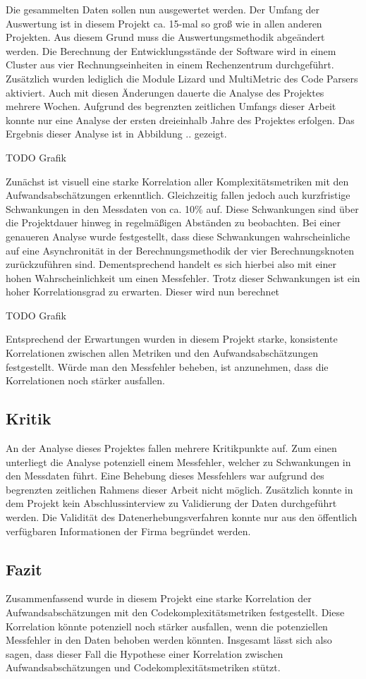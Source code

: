 Die gesammelten Daten sollen nun ausgewertet werden. Der Umfang der
Auswertung ist in diesem Projekt ca. 15-mal so groß wie in allen anderen
Projekten. Aus diesem Grund muss die Auswertungsmethodik abgeändert
werden. Die Berechnung der Entwicklungsstände der Software wird in einem
Cluster aus vier Rechnungseinheiten in einem Rechenzentrum durchgeführt.
Zusätzlich wurden lediglich die Module Lizard und MultiMetric des Code
Parsers aktiviert. Auch mit diesen Änderungen dauerte die Analyse des
Projektes mehrere Wochen. Aufgrund des begrenzten zeitlichen Umfangs
dieser Arbeit konnte nur eine Analyse der ersten dreieinhalb Jahre des
Projektes erfolgen. Das Ergebnis dieser Analyse ist in Abbildung ..
gezeigt.

TODO Grafik

Zunächst ist visuell eine starke Korrelation aller Komplexitätsmetriken
mit den Aufwandsabschätzungen erkenntlich. Gleichzeitig fallen jedoch
auch kurzfristige Schwankungen in den Messdaten von ca. 10\% auf. Diese
Schwankungen sind über die Projektdauer hinweg in regelmäßigen Abständen
zu beobachten. Bei einer genaueren Analyse wurde festgestellt, dass
diese Schwankungen wahrscheinliche auf eine Asynchronität in der
Berechnungsmethodik der vier Berechnungsknoten zurückzuführen sind.
Dementsprechend handelt es sich hierbei also mit einer hohen
Wahrscheinlichkeit um einen Messfehler. Trotz dieser Schwankungen ist
ein hoher Korrelationsgrad zu erwarten. Dieser wird nun berechnet

TODO Grafik

Entsprechend der Erwartungen wurden in diesem Projekt starke,
konsistente Korrelationen zwischen allen Metriken und den
Aufwandsabschätzungen festgestellt. Würde man den Messfehler beheben,
ist anzunehmen, dass die Korrelationen noch stärker ausfallen.

\subsection{Kritik}\label{gitlab-kritik}

An der Analyse dieses Projektes fallen mehrere Kritikpunkte auf. Zum
einen unterliegt die Analyse potenziell einem Messfehler, welcher zu
Schwankungen in den Messdaten führt. Eine Behebung dieses Messfehlers
war aufgrund des begrenzten zeitlichen Rahmens dieser Arbeit nicht
möglich. Zusätzlich konnte in dem Projekt kein Abschlussinterview zu
Validierung der Daten durchgeführt werden. Die Validität des
Datenerhebungsverfahren konnte nur aus den öffentlich verfügbaren
Informationen der Firma begründet werden.

\subsection{Fazit}\label{gitlab-Fazit}

Zusammenfassend wurde in diesem Projekt eine starke Korrelation der
Aufwandsabschätzungen mit den Codekomplexitätsmetriken festgestellt.
Diese Korrelation könnte potenziell noch stärker ausfallen, wenn die
potenziellen Messfehler in den Daten behoben werden könnten. Insgesamt
lässt sich also sagen, dass dieser Fall die Hypothese einer Korrelation
zwischen Aufwandsabschätzungen und Codekomplexitätsmetriken stützt.